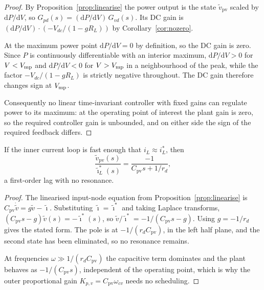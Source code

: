 \begin{proof}
By Proposition~\ref{prop:linearise} the power output is the state
$\tilde v_{\mathrm{pv}}$ scaled by $\mathrm{d}P/\mathrm{d}V$, so
$G_{pd}(s) = (\mathrm{d}P/\mathrm{d}V)\,G_{vd}(s)$. Its DC gain is
$(\mathrm{d}P/\mathrm{d}V)\cdot\left(-V_{dc}/(1-gR_L)\right)$ by
Corollary~\ref{cor:nozero}.

At the maximum power point $\mathrm{d}P/\mathrm{d}V = 0$ by definition, so the
DC gain is zero. Since $P$ is continuously differentiable with an interior
maximum, $\mathrm{d}P/\mathrm{d}V > 0$ for $V < V_{\mathrm{mp}}$ and
$\mathrm{d}P/\mathrm{d}V < 0$ for $V > V_{\mathrm{mp}}$ in a neighbourhood of the peak,
while the factor $-V_{dc}/(1-gR_L)$ is strictly negative throughout. The DC gain
therefore changes sign at $V_{\mathrm{mp}}$.

Consequently no linear time-invariant controller with fixed gains can regulate
power to its maximum: at the operating point of interest the plant gain is zero,
so the required controller gain is unbounded, and on either side the sign of the
required feedback differs.
\end{proof}

\begin{proposition}
\label{prop:outer}
If the inner current loop is fast enough that $i_L \approx i_L^\ast$, then
\[
\frac{\tilde v_{\mathrm{pv}}(s)}{\tilde\imath_L^\ast(s)} = \frac{-1}{C_{\mathrm{pv}}s + 1/r_d},
\]
a first-order lag with no resonance.
\end{proposition}

\begin{proof}
The linearised input-node equation from Proposition~\ref{prop:linearise} is
$C_{\mathrm{pv}}\dot{\tilde v} = g\tilde v - \tilde\imath$. Substituting
$\tilde\imath = \tilde\imath^\ast$ and taking Laplace transforms,
$(C_{\mathrm{pv}}s - g)\tilde v(s) = -\tilde\imath^\ast(s)$, so
$\tilde v/\tilde\imath^\ast = -1/(C_{\mathrm{pv}}s - g)$. Using $g = -1/r_d$
gives the stated form. The pole is at $-1/(r_d C_{\mathrm{pv}})$, in the left
half plane, and the second state has been eliminated, so no resonance remains.

At frequencies $\omega \gg 1/(r_d C_{\mathrm{pv}})$ the capacitive term
dominates and the plant behaves as $-1/(C_{\mathrm{pv}}s)$, independent of the
operating point, which is why the outer proportional gain
$K_{p,v} = C_{\mathrm{pv}}\omega_{cv}$ needs no scheduling.
\end{proof}

